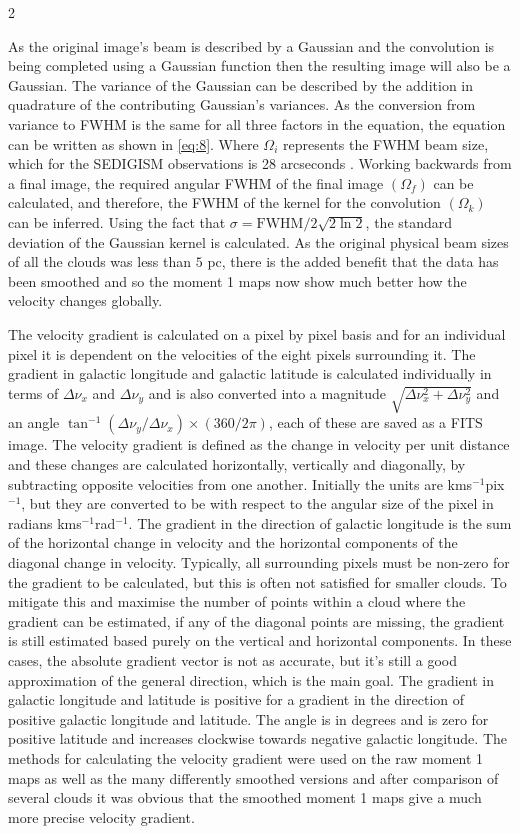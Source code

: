\documentclass[a4paper,11pt]{article}
\begin{document}
\begin{multicols}{2}
\par\noindent As the original image's beam is described by a Gaussian and the convolution is being completed using a Gaussian function then the resulting image will also be a Gaussian. The variance of the Gaussian can be described by the addition in quadrature of the contributing Gaussian's variances. As the conversion from variance to FWHM is the same for all three factors in the equation, the equation can be written as shown in \autoref{eq:8}. Where $\Omega_i$ represents the FWHM beam size, which for the SEDIGISM observations is 28 arcseconds \parencite{SEDIGISM_ana}. Working backwards from a final image, the required angular FWHM of the final image $(\Omega_f)$ can be calculated, and therefore, the FWHM of the kernel for the convolution $(\Omega_k)$ can be inferred. Using the fact that $\sigma = \text{FWHM} / 2\sqrt{2\ln{2}}$, the standard deviation of the Gaussian kernel is calculated. As the original physical beam sizes of all the clouds was less than $5$ pc, there is the added benefit that the data has been smoothed and so the moment 1 maps now show much better how the velocity changes globally.
\smallskip
\par\noindent The velocity gradient is calculated on a pixel by pixel basis and for an individual pixel it is dependent on the velocities of the eight pixels surrounding it. The gradient in galactic longitude and galactic latitude is calculated individually in terms of $\Delta\nu_x$ and $\Delta\nu_y$ and is also converted into a magnitude $\sqrt{\Delta\nu_x^2 + \Delta\nu_y^2}$ and an angle $\tan^{-1}\left(\Delta\nu_y / \Delta\nu_x\right)\times(360/2\pi)$, each of these are saved as a FITS image. The velocity gradient is defined as the change in velocity per unit distance and these changes are calculated horizontally, vertically and diagonally, by subtracting opposite velocities from one another. Initially the units are kms$^{-1}$pix$^{-1}$, but they are converted to be with respect to the angular size of the pixel in radians kms$^{-1}$rad$^{-1}$. The gradient in the direction of galactic longitude is the sum of the horizontal change in velocity and the horizontal components of the diagonal change in velocity. Typically, all surrounding pixels must be non-zero for the gradient to be calculated, but this is often not satisfied for smaller clouds. To mitigate this and maximise the number of points within a cloud where the gradient can be estimated, if any of the diagonal points are missing, the gradient is still estimated based purely on the vertical and horizontal components. In these cases, the absolute gradient vector is not as accurate, but it's still a good approximation of the general direction, which is the main goal. The gradient in galactic longitude and latitude is positive for a gradient in the direction of positive galactic longitude and latitude. The angle is in degrees and is zero for positive latitude and increases clockwise towards negative galactic longitude. The methods for calculating the velocity gradient were used on the raw moment 1 maps as well as the many differently smoothed versions and after comparison of several clouds it was obvious that the smoothed moment 1 maps give a much more precise velocity gradient.


\end{multicols}
\end{document}
